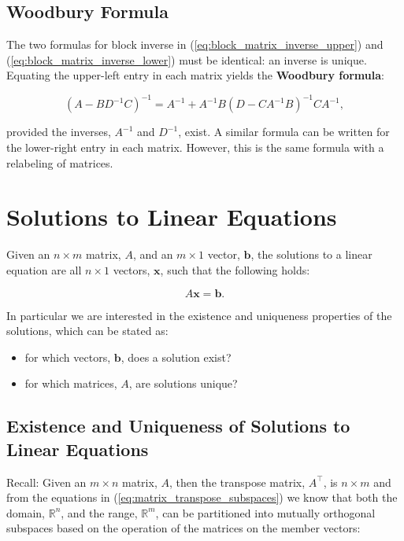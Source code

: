 \documentclass[12pt, twoside, draft]{article}
\begin{document}
\subsection{Woodbury Formula}\label{sec:woodbury-formula}
The two formulas for block inverse in (\ref{eq:block_matrix_inverse_upper}) and (\ref{eq:block_matrix_inverse_lower}) must be identical: an inverse is unique.  Equating the upper-left entry in each matrix yields the \textbf{Woodbury formula}:

\begin{equation}\label{eq:Woodbury_formul}
\left(A - BD^{-1}C \right)^{-1} = A^{-1} + A^{-1} B \left( D - CA^{-1}B \right)^{-1} CA^{-1},
\end{equation}

provided the inverses, $A^{-1}$ and $D^{-1}$, exist.  A similar formula can be written for the lower-right entry in each matrix.  However, this is the same formula with a relabeling of matrices.

\section{Solutions to Linear Equations}\label{solutions-linear-equations}
Given an $n \times m$ matrix, $A$, and an $m \times 1$ vector, $\mathbf{b}$, the solutions to a linear equation are all $n \times 1$ vectors, $\mathbf{x}$, such that the following holds:

\begin{equation}\label{eq:linear_equation}
A \mathbf{x} = \mathbf{b}.
\end{equation}

In particular we are interested in the existence and uniqueness properties of the solutions, which can be stated as:
\begin{itemize}[noitemsep]
\item for which vectors, $\mathbf{b}$, does a solution exist?
\item for which matrices, $A$, are solutions unique?
\end{itemize}

\subsection{Existence and Uniqueness of Solutions to Linear Equations}\label{sec:existence-uniqueness-linear-equations}
Recall: Given an $m \times n$ matrix, $A$, then the transpose matrix, $A^\top$, is $n \times m$ and from the equations in (\ref{eq:matrix_transpose_subspaces}) we know that both the domain, $\mathbb{R}^n$, and the range, $\mathbb{R}^m$, can be partitioned into mutually orthogonal subspaces based on the operation of the matrices on the member vectors:
\end{document}
